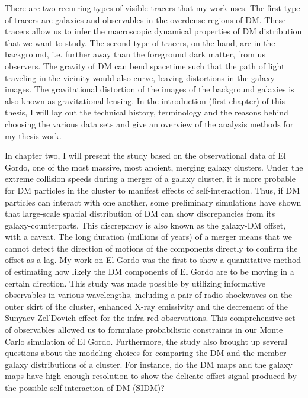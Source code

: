 \documentclass[ucdthesis.tex]{subfiles}
\begin{document}
		There are two recurring types of visible tracers that 
		my work uses. The first type of tracers are galaxies and observables in the 
		 overdense regions of DM. These tracers allow 
		us to infer the macroscopic dynamical properties of DM distribution that 
		we want to study. The
		second type of tracers, on the hand, are in the background, i.e.
		further away than the foreground dark matter, from us observers. The
		gravity of DM can bend spacetime such that the path of light traveling in 
		the vicinity would also curve, leaving distortions in the galaxy images. 
		The gravitational distortion of the images 
		of the background galaxies is also known as gravitational lensing. In the
		introduction (first chapter) of this thesis, I will lay out the technical
		history, terminology and the reasons behind choosing the various data sets
		and give an overview of the analysis methods for my thesis work. 
		
			In chapter two, I will present the study based on the observational data 
			of El Gordo, one of the most massive, most ancient, merging galaxy clusters. 
		Under the extreme collision speeds during a merger of a galaxy cluster, 
		it is more probable for DM particles in the cluster to manifest effects of
		self-interaction. 
		Thus, if DM particles can interact with one another, 		
		some preliminary simulations have shown that large-scale spatial distribution of DM
		can show discrepancies from its galaxy-counterparts. This discrepancy 
		is also known as the galaxy-DM offset, with a caveat. The long duration 
		(millions of years) 
		of a merger means that we cannot detect the
		direction of motions of the components directly to confirm the offset as
		a lag. My work on El Gordo was the first to show a quantitative method of estimating
		how likely the DM components of El Gordo are to be moving in a certain
		direction.	This study was made possible by utilizing informative
		observables in various wavelengths, including a pair of radio shockwaves on
		the outer skirt of the cluster, enhanced X-ray emissivity and the decrement of the
		Sunyaev-Zel'Dovich effect for the infra-red observations.
		This comprehensive set of observables allowed us to formulate 
		probabilistic constraints in our Monte Carlo simulation of El Gordo.
		Furthermore, the study also brought up several questions about the modeling
		choices for comparing the DM and the member-galaxy distributions of a cluster.
		For instance, do the DM maps and the galaxy maps have high enough
		resolution to show the delicate offset signal produced by the possible
		self-interaction of DM (SIDM)?
		
\end{document}
